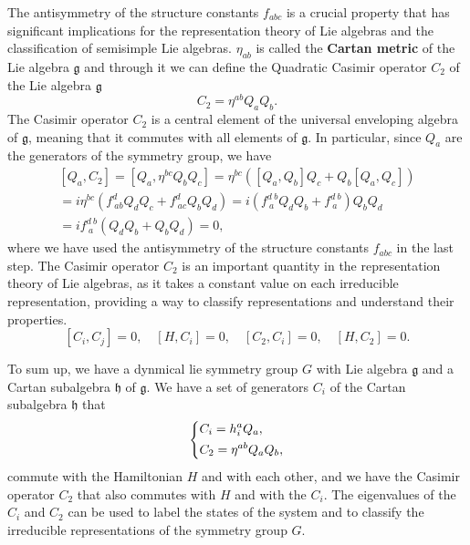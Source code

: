 The antisymmetry of the structure constants \(f_{abc}\) is a crucial property that has significant implications for the representation theory of Lie algebras and the classification of semisimple Lie algebras. \(\eta_{ab}\) is called the \textbf{Cartan metric} of the Lie algebra \(\mathfrak{g}\) and through it we can define the Quadratic Casimir operator \(C_2\) of the Lie algebra \(\mathfrak{g}\)
\[
    C_2 = \eta^{ab} Q_a Q_b.
\]
The Casimir operator \(C_2\) is a central element of the universal enveloping algebra of \(\mathfrak{g}\), meaning that it commutes with all elements of \(\mathfrak{g}\). In particular, since \(Q_a\) are the generators of the symmetry group, we have
\[
    \begin{aligned}
        [Q_a, C_2] = [Q_a, \eta^{bc} Q_b Q_c] = \eta^{bc} ([Q_a, Q_b] Q_c + Q_b [Q_a, Q_c])                               \\
        = i \eta^{bc} (f^d_{\ ab} Q_d Q_c + f^d_{\ ac} Q_b Q_d) = i ( f^{d \ b}_{\ a} Q_d Q_b + f^{d \ b}_{\ a} ) Q_b Q_d \\
        = i f^{d \ b}_{\ a} (Q_d Q_b + Q_b Q_d) = 0,
    \end{aligned}
\]
where we have used the antisymmetry of the structure constants \(f_{abc}\) in the last step. The Casimir operator \(C_2\) is an important quantity in the representation theory of Lie algebras, as it takes a constant value on each irreducible representation, providing a way to classify representations and understand their properties.
\[
    [C_i, C_j] = 0, \quad [H, C_i]=0, \quad [C_2, C_i] = 0, \quad [H, C_2] = 0.
\]

To sum up, we have a dynmical lie symmetry group \(G\) with Lie algebra \(\mathfrak{g}\) and a Cartan subalgebra \(\mathfrak{h}\) of \(\mathfrak{g}\). We have a set of generators \(C_i\) of the Cartan subalgebra \(\mathfrak{h}\) that
\[
    \begin{dcases}
        C_i = h_i^a Q_a, \\
        C_2 = \eta^{ab} Q_a Q_b,
    \end{dcases}
\]
commute with the Hamiltonian \(H\) and with each other, and we have the Casimir operator \(C_2\) that also commutes with \(H\) and with the \(C_i\). The eigenvalues of the \(C_i\) and \(C_2\) can be used to label the states of the system and to classify the irreducible representations of the symmetry group \(G\).

